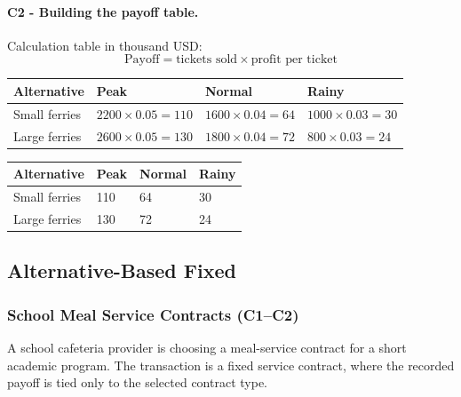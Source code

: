 
	\paragraph*{C2 - Building the payoff table.}
	\label{subsec:problem9-lake-ferry-tourism-c2}
	Calculation table in thousand USD:
	\[
	\text{Payoff}=\text{tickets sold}\times\text{profit per ticket}
	\]
	\begin{center}
		\begin{tabular}{llll}
			\toprule
			Alternative & Peak & Normal & Rainy \\
			\midrule
			Small ferries & $2200 \times 0.05 = 110$ & $1600 \times 0.04 = 64$ & $1000 \times 0.03 = 30$ \\
			Large ferries & $2600 \times 0.05 = 130$ & $1800 \times 0.04 = 72$ & $800 \times 0.03 = 24$ \\
			\bottomrule
		\end{tabular}
	\end{center}

	\begin{center}
		\begin{tabular}{llll}
			\toprule
			Alternative & Peak & Normal & Rainy \\
			\midrule
			Small ferries & 110 & 64 & 30 \\
			Large ferries & 130 & 72 & 24 \\
			\bottomrule
		\end{tabular}
	\end{center}


	\subsection{Alternative-Based Fixed}
	\label{sec:alternative-based-fixed-payoff-only}


	\subsubsection{School Meal Service Contracts (C1--C2)}
	\label{sec:problem10-school-meal-service-contracts-c1-c2}
	A school cafeteria provider is choosing a meal-service contract for a short academic program. The transaction is a fixed service contract, where the recorded payoff is tied only to the selected contract type.


